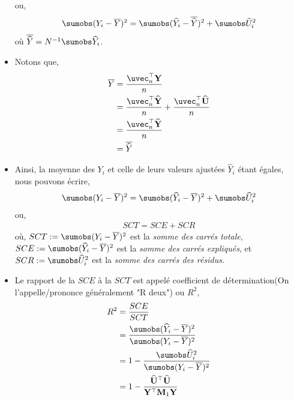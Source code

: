 \begin{frame}[allowframebreaks]
\begin{itemize}
ou,
\begin{align*}
\sumobs(Y_i-\overline{Y})^2 = \sumobs(\widehat{Y}_i - \overline{\widehat{Y}})^2 + \sumobs \widehat{U}_i^2
\end{align*}
où $\overline{\widehat{Y}} = N^{-1}\sumobs \widehat{Y}_i$. 
\item Notons que,
\begin{align*}
\overline{Y} &= \frac{\uvec_n^\top\mathbf{Y}}{n} \\
&= \frac{\uvec_n^\top\widehat{\mathbf{Y}}}{n}
+ \frac{\uvec_n^\top\widehat{\mathbf{U}}}{n}\\
& = \frac{\uvec_n^\top\widehat{\mathbf{Y}}}{n} \\
&= \overline{\widehat{Y}}
\end{align*}
\item Ainsi, la moyenne des $Y_i$ et celle de leurs valeurs ajustées $\widehat{Y}_i$ étant égales, nous pouvons écrire,
\begin{align*}
\sumobs(Y_i-\overline{Y})^2 = \sumobs(\widehat{Y}_i - \overline{Y})^2 + \sumobs \widehat{U}_i^2
\end{align*}
ou,
\begin{align*}
SCT = SCE + SCR
\end{align*}
où,
$SCT := \sumobs(Y_i-\overline{Y})^2$ est la \emph{somme des carrés totale},  $SCE :=  \sumobs(\widehat{Y}_i - \overline{Y})^2$  est la \emph{somme des carrés expliqués}, et $SCR:= \sumobs \widehat{U}_i^2$ est la \emph{somme des carrés des résidus}.
\item Le rapport de la $SCE$ à la $SCT$ est appelé coefficient de détermination(On l'appelle/prononce généralement "R deux") ou $R^2$,
\begin{align*}
R^2 &= \frac{SCE}{SCT}\\
& = \frac{ \sumobs(\widehat{Y}_i - \overline{Y})^2}{\sumobs(Y_i-\overline{Y})^2}\\
&=1 - \frac{\sumobs \widehat{U}_i^2}{\sumobs(Y_i-\overline{Y})^2}\\
& = 1 - \frac{\widehat{\mathbf{U}}^\top\widehat{\mathbf{U}}}{\mathbf{Y}^\top\mathbf{M}_1\mathbf{Y}}
\end{align*}
\end{itemize}
\end{frame}


